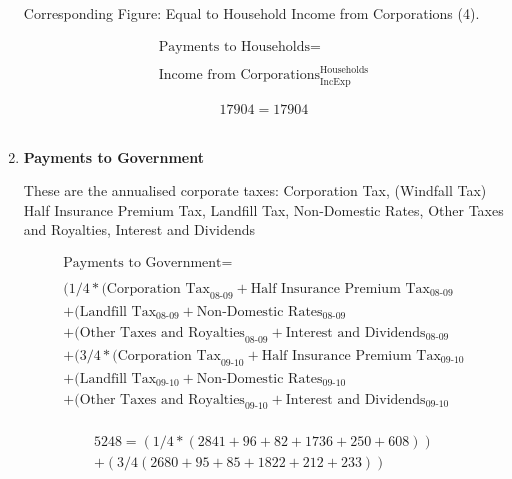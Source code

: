 \begin{enumerate}
Corresponding Figure: Equal to Household Income from Corporations (4).

\begin{equation}
\begin{split}
\text{Payments to Households} =  \\ \\
\text{Income from Corporations}^\text{Households}_\text{IncExp}
\end{split} \label{eq:2.5.29}
\end{equation}

\begin{equation} \nonumber
17904 = 17904
\end{equation}\\


\item \textbf {Payments to Government}

These are the annualised corporate taxes: Corporation Tax, (Windfall Tax) Half Insurance Premium Tax, Landfill Tax, Non-Domestic Rates, Other Taxes and Royalties, Interest and Dividends \cite{ScotGov2013b}

\begin{equation}
\begin{split}
\text{Payments to Government} =  \\ \\
(1/4*(\text{Corporation Tax}_\text{08-09}+\text{Half Insurance Premium Tax}_\text{08-09}\\
+(\text{Landfill Tax}_\text{08-09}+\text{Non-Domestic Rates}_\text{08-09}\\
+(\text{Other Taxes and Royalties}_\text{08-09}+\text{Interest and Dividends}_\text{08-09}\\
+(3/4*(\text{Corporation Tax}_\text{09-10}+\text{Half Insurance Premium Tax}_\text{09-10}\\
+(\text{Landfill Tax}_\text{09-10}+\text{Non-Domestic Rates}_\text{09-10}\\
+(\text{Other Taxes and Royalties}_\text{09-10}+\text{Interest and Dividends}_\text{09-10}\\
\end{split} \label{eq:2.5.30}
\end{equation}

\begin{equation} \nonumber
\begin{split}
5248 = (1/4*(2841+96+82+1736+250+608))\\
+(3/4(2680+95+85+1822+212+233))
\end{split}
\end{equation}\\



\end{enumerate}
